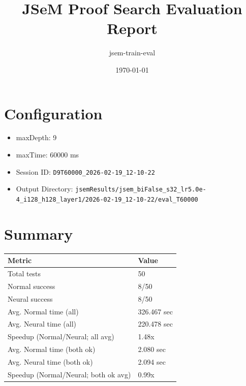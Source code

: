 \documentclass[a4paper,10pt]{article}
\title{JSeM Proof Search Evaluation Report}
\author{jsem-train-eval}
\date{\today}
\begin{document}
\maketitle

\section{Configuration}
\begin{itemize}
\item maxDepth: 9
\item maxTime: 60000 ms
\item Session ID: \texttt{D9T60000\_2026-02-19\_12-10-22}
\item Output Directory: \texttt{jsemResults/jsem\_biFalse\_s32\_lr5.0e-4\_i128\_h128\_layer1/2026-02-19\_12-10-22/eval\_T60000}
\end{itemize}

\section{Summary}
\begin{tabular}{ll}
\toprule
\textbf{Metric} & \textbf{Value} \\
\midrule
Total tests & 50 \\
Normal success & 8/50 \\
Neural success & 8/50 \\
\midrule
Avg. Normal time (all) & 326.467 sec \\
Avg. Neural time (all) & 220.478 sec \\
Speedup (Normal/Neural; all avg) & 1.48x \\
Avg. Normal time (both ok) & 2.080 sec \\
Avg. Neural time (both ok) & 2.094 sec \\
Speedup (Normal/Neural; both ok avg) & 0.99x \\
\bottomrule
\end{tabular}
\end{document}

